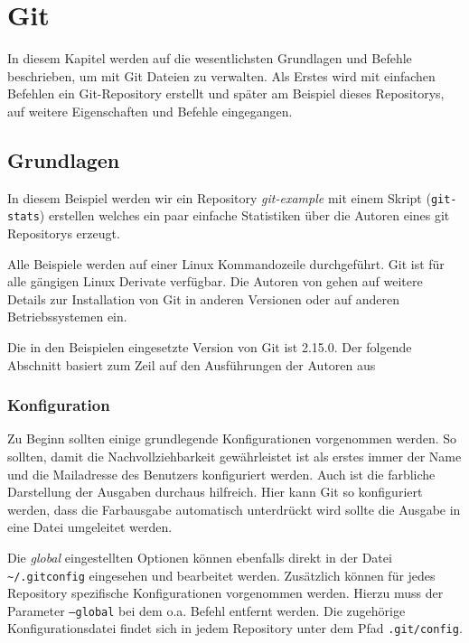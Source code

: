 \chapter{Git}\label{cha:git}
In diesem Kapitel werden auf die wesentlichsten Grundlagen und Befehle
beschrieben, um mit Git Dateien zu verwalten. Als Erstes wird mit einfachen
Befehlen ein Git-Repository erstellt und später am Beispiel dieses Repositorys,
auf weitere Eigenschaften und Befehle eingegangen.

\section{Grundlagen}\label{gitbasics}
In diesem Beispiel werden wir ein Repository \textit{git-example} mit einem
Skript (\texttt{git-stats}) erstellen welches ein paar einfache Statistiken
über die Autoren eines git Repositorys erzeugt.

Alle Beispiele werden auf einer Linux Kommandozeile durchgeführt. Git ist für
alle gängigen Linux Derivate verfügbar. Die Autoren von \cite[S.~12-14]{progit}
gehen auf weitere Details zur Installation von Git in anderen Versionen oder
auf anderen Betriebssystemen ein.

Die in den Beispielen eingesetzte Version von Git ist 2.15.0. Der folgende
Abschnitt basiert zum Zeil auf den Ausführungen der Autoren aus
\cite[S.22-57]{gitosp}



\subsection{Konfiguration}\label{gitconfig}
Zu Beginn sollten einige grundlegende Konfigurationen vorgenommen werden. So
sollten, damit die Nachvollziehbarkeit gewährleistet ist als erstes immer der
Name und die Mailadresse des Benutzers konfiguriert werden. Auch ist die
farbliche Darstellung der Ausgaben durchaus hilfreich. Hier kann Git so
konfiguriert werden, dass die Farbausgabe automatisch unterdrückt wird sollte
die Ausgabe in eine Datei umgeleitet werden.



Die \textit{global} eingestellten Optionen können ebenfalls direkt in der Datei
\texttt{\textasciitilde/.gitconfig} eingesehen und bearbeitet werden.
Zusätzlich können für jedes Repository spezifische Konfigurationen vorgenommen
werden. Hierzu muss der Parameter \texttt{--global} bei dem o.a. Befehl
entfernt werden. Die zugehörige Konfigurationsdatei findet sich in jedem
Repository unter dem Pfad \texttt{.git/config}.

